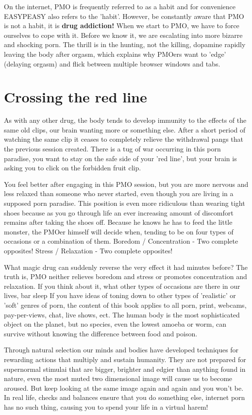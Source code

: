 \documentclass[easypeasy.tex]{subfiles}
\begin{document}
On the internet, PMO is frequently referred to as a habit and for convenience EASYPEASY also refers to the 'habit'. However, be constantly aware that PMO is not a habit, it is \textbf{drug addiction!} When we start to PMO, we have to force ourselves to cope with it. Before we know it, we are escalating into more bizarre and shocking porn. The thrill is in the hunting, not the killing, dopamine rapidly leaving the body after orgasm, which explains why PMOers want to 'edge' (delaying orgasm) and flick between multiple browser windows and tabs.

    \section{Crossing the red line}
As with any other drug, the body tends to develop immunity to the effects of the same old clips, our brain wanting more or something else. After a short period of watching the same clip it ceases to completely relieve the withdrawal pangs that the previous session created. There is a tug of war occurring in this porn paradise, you want to stay on the safe side of your 'red line', but your brain is asking you to click on the forbidden fruit clip.

You feel better after engaging in this PMO session, but you are more nervous and less relaxed than someone who never started, even though you are living in a supposed porn paradise. This position is even more ridiculous than wearing tight shoes because as you go through life an ever increasing amount of discomfort remains after taking the shoes off. Because he knows he has to feed the little monster, the PMOer himself will decide when, tending to be on four types of occasions or a combination of them.
  Boredom / Concentration - Two complete opposites!
  Stress / Relaxation - Two complete opposites!

What magic drug can suddenly reverse the very effect it had minutes before? The truth is, PMO neither relieves boredom and stress or promotes concentration and relaxation. If you think about it, what other types of occasions are there in our lives, bar sleep If you have ideas of toning down to other types of 'realistic' or 'soft' genres of porn, the content of this book applies to all porn, print, webcams, pay-per-views, chat, live shows, ect. The human body is the most sophisticated object on the planet, but no species, even the lowest amoeba or worm, can survive without knowing the difference between food and poison.

Through natural selection our minds and bodies have developed techniques for rewarding actions that multiply and sustain humanity. They are not prepared for supernormal stimulai that are bigger, brighter and edgier than anything found in nature, even the most muted two dimensional image will cause us to become aroused. But keep looking at the same image again and again and you won't be. In real life, checks and balances ensure that you do something else, internet porn has no such thing, causing you to spend your life in a virtual harem!
\end{document}
